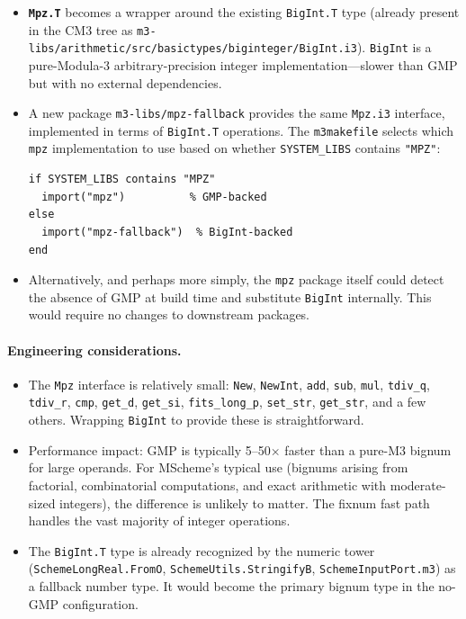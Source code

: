 \documentclass[12pt]{article}
\begin{document}
\begin{itemize}
\item \textbf{{\tt Mpz.T}} becomes a wrapper around the existing
  {\tt BigInt.T} type (already present in the CM3 tree as
  {\tt m3-libs/arithmetic/src/basictypes/biginteger/BigInt.i3}).
  {\tt BigInt} is a pure-Modula-3 arbitrary-precision integer
  implementation---slower than GMP but with no external
  dependencies.

\item A new package {\tt m3-libs/mpz-fallback} provides the same
  {\tt Mpz.i3} interface, implemented in terms of {\tt BigInt.T}
  operations.  The {\tt m3makefile} selects which {\tt mpz}
  implementation to use based on whether {\tt SYSTEM\_LIBS}
  contains {\tt "MPZ"}:

\begin{lstlisting}[language={}]
if SYSTEM_LIBS contains "MPZ"
  import("mpz")          % GMP-backed
else
  import("mpz-fallback")  % BigInt-backed
end
\end{lstlisting}

\item Alternatively, and perhaps more simply, the {\tt mpz}
  package itself could detect the absence of GMP at build time
  and substitute {\tt BigInt} internally.  This would require no
  changes to downstream packages.
\end{itemize}

\paragraph{Engineering considerations.}
\begin{itemize}[nosep]
\item The {\tt Mpz} interface is relatively small: {\tt New},
  {\tt NewInt}, {\tt add}, {\tt sub}, {\tt mul}, {\tt tdiv\_q},
  {\tt tdiv\_r}, {\tt cmp}, {\tt get\_d}, {\tt get\_si},
  {\tt fits\_long\_p}, {\tt set\_str}, {\tt get\_str}, and a few
  others.  Wrapping {\tt BigInt} to provide these is
  straightforward.

\item Performance impact: GMP is typically 5--50$\times$ faster
  than a pure-M3 bignum for large operands.  For MScheme's
  typical use (bignums arising from factorial, combinatorial
  computations, and exact arithmetic with moderate-sized
  integers), the difference is unlikely to matter.  The fixnum
  fast path handles the vast majority of integer operations.

\item The {\tt BigInt.T} type is already recognized by the
  numeric tower ({\tt SchemeLongReal.FromO}, {\tt SchemeUtils.StringifyB},
  {\tt SchemeInputPort.m3}) as a fallback number type.  It would
  become the primary bignum type in the no-GMP configuration.
\end{itemize}
\end{document}
